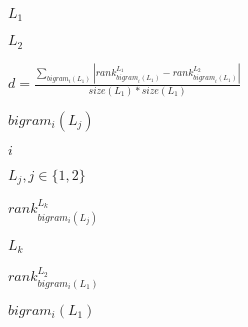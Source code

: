 \documentclass{article}
\begin{document}
$L_1$
\pagebreak

$L_2$
\pagebreak

$d = \frac{ \sum_{bigram_i(L_1)} | rank_{bigram_i(L_1)}^{L_1} - rank_{bigram_i(L_1)}^{L_2} | }{size(L_1) * size(L_1)}$
\pagebreak

$bigram_i(L_j)$
\pagebreak

$i$
\pagebreak

$L_j, j \in \{1, 2\}$
\pagebreak

$rank_{bigram_i(L_j)}^{L_k}$
\pagebreak

$L_k$
\pagebreak

$rank_{bigram_i(L_1)}^{L_2}$
\pagebreak

$bigram_i(L_1)$
\pagebreak
\end{document}

